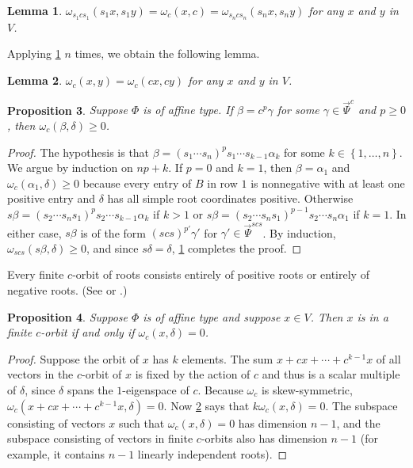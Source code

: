 \documentclass{amsart}
\newtheorem{proposition}{Proposition}[section]
\newtheorem{lemma}[proposition]{Lemma}
\theoremstyle{definition}
\theoremstyle{remark}
\numberwithin{equation}{section}
\newcommand{\set}[1]{{\left\lbrace #1 \right\rbrace}}
\newcommand{\0}{{\mathbf{0}}}
\newcommand{\RSChar}{\Phi}
\newcommand{\RS}{\RSChar}
\newcommand{\TravInfChar}{\Psi}
\newcommand{\TravProj}[1]{\overrightarrow{\TravInfChar}^{#1}}
\begin{document}
\begin{lemma}\label{omega s}
$\omega_{s_1cs_1}(s_1x,s_1y)=\omega_c(x,c)=\omega_{s_ncs_n}(s_nx,s_ny)$ for any $x$ and $y$ in $V$.
\end{lemma}

Applying \cref{omega s} $n$ times, we obtain the following lemma.

\begin{lemma}\label{omega c}
$\omega_c(x,y)=\omega_c(cx,cy)$ for any $x$ and $y$ in $V$.
\end{lemma}

\begin{proposition}\label{om del}
Suppose $\RS$ is of affine type.
If $\beta=c^p\gamma$ for some $\gamma\in\TravProj{c}$ and $p\ge0$, then $\omega_c(\beta,\delta)\ge0$. 
\end{proposition}
\begin{proof}
The hypothesis is that $\beta=(s_1\cdots s_n)^ps_1\cdots s_{k-1}\alpha_k$ for some $k\in\set{1,\ldots,n}$.
We argue by induction on $np+k$.
If $p=0$ and $k=1$, then $\beta=\alpha_1$ and $\omega_c(\alpha_1,\delta)\ge0$ because every entry of $B$ in row $1$ is nonnegative with at least one positive entry and $\delta$ has all simple root coordinates positive.
Otherwise $s\beta=(s_2\cdots s_ns_1)^ps_2\cdots s_{k-1}\alpha_k$ if $k>1$ or $s\beta=(s_2\cdots s_ns_1)^{p-1}s_2\cdots s_n\alpha_1$ if $k=1$.
In either case, $s\beta$ is of the form $(scs)^{p'}\gamma'$ for $\gamma'\in\TravProj{scs}$.
By induction, $\omega_{scs}(s\beta,\delta)\ge0$, and since $s\delta=\delta$, \cref{omega s} completes the proof.
\end{proof}

Every finite $c$-orbit of roots consists entirely of positive roots or entirely of negative roots.
(See \cite[Chapter~1]{Dlab-Ringel} or \cite[Theorem~1.2(5)]{afforb}.)

\begin{proposition}\label{om del fin}
Suppose $\RS$ is of affine type and suppose $x\in V$.
Then $x$ is in a finite $c$-orbit if and only if $\omega_c(x,\delta)=0$.
\end{proposition}
\begin{proof}
Suppose the orbit of $x$ has $k$ elements.
The sum $x+cx+\cdots+c^{k-1}x$ of all vectors in the $c$-orbit of $x$ is fixed by the action of $c$ and thus is a scalar multiple of $\delta$, since $\delta$ spans the $1$-eigenspace of $c$.
Because $\omega_c$ is skew-symmetric, $\omega_c(x+cx+\cdots+c^{k-1}x,\delta)=0$.
Now \cref{omega c} says that $k\omega_c(x,\delta)=0$.
The subspace consisting of vectors $x$ such that $\omega_c(x,\delta)=0$ has dimension $n-1$, and the subspace consisting of vectors in finite $c$-orbits also has dimension $n-1$ (for example, it contains $n-1$ linearly independent roots).
\end{proof}
\end{document}

